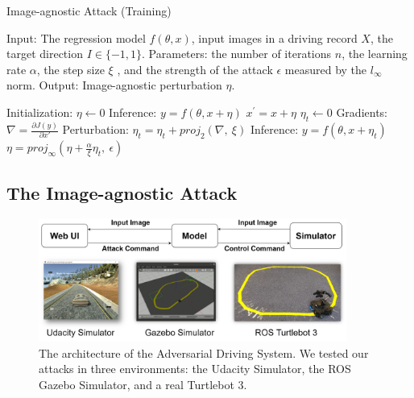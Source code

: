 
\begin{algorithm}[t]
    \caption{Image-agnostic Attack (Training)}\label{alg:image-agnostic-driving}
    \begin{algorithmic}
        \State Input: The regression model $f(\theta, x)$, input images in a driving record $X$, the target direction $I \in \{-1, 1\}$.
        \State Parameters: the number of iterations $n$, the learning rate $\alpha$, the step size $\xi$ , and the strength of the attack $\epsilon$ measured by the $l_{\infty}$ norm.
        \State Output: Image-agnostic perturbation $\eta$.

        \State Initialization: $\eta \leftarrow 0$
                \State Inference: $y = f(\theta, x + \eta)$
                    \State $x^{'} = x + \eta$
                    \State $\eta_{t} \leftarrow 0$
                        \State Gradients: $\nabla = \frac{\partial J(y)}{\partial x'}$
                        \State Perturbation: $\eta_{t} = \eta_{t} + proj_{2}(\nabla,\ \xi)$
                        \State Inference: $y = f(\theta, x + \eta_t)$
                    \EndWhile
                    \State $\eta = proj_{\infty}(\eta + \frac{\alpha}{\xi} \eta_{t},\ \epsilon)$
                \EndIf
            \EndFor
        \EndFor
    \end{algorithmic}
\end{algorithm}

\subsection{The Image-agnostic Attack}

\begin{figure}[b]
    \centering
    \includegraphics[width=0.9\textwidth]{figures/chapter_driving/architechture.jpg}
    \caption{The architecture of the Adversarial Driving System. We tested our attacks in three environments: the Udacity Simulator, the ROS Gazebo Simulator, and a real Turtlebot 3.}
    \label{fig:arch}
\end{figure}


